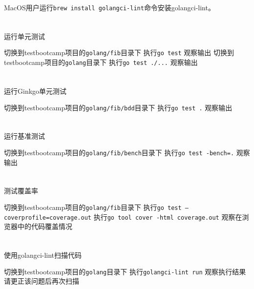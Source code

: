 \documentclass[12pt,addpoints,fleqn]{exam}
\begin{document}
\begin{questions}
\begin{parts}
MacOS用户运行\verb=brew install golangci-lint=命令安装golangci-lint。

  \part{}运行单元测试
  \begin{subparts}
    \subpart{}切换到testbootcamp项目的\verb=golang/fib=目录下
    \subpart{}执行\verb=go test=
    \subpart{}观察输出
    \subpart{}切换到testbootcamp项目的\verb=golang=目录下
    \subpart{}执行\verb=go test ./...=
    \subpart{}观察输出 
  \end{subparts}

  \part{}运行Ginkgo单元测试
  \begin{subparts}
    \subpart{}切换到testbootcamp项目的\verb=golang/fib/bdd=目录下
    \subpart{}执行\verb=go test .=
    \subpart{}观察输出
  \end{subparts}
  \part{}运行基准测试
  \begin{subparts}
    \subpart{}切换到testbootcamp项目的\verb=golang/fib/bench=目录下
    \subpart{}执行\verb#go test -bench=.#
    \subpart{}观察输出
  \end{subparts}
  \part{}测试覆盖率
  \begin{subparts}
    \subpart{}切换到testbootcamp项目的\verb=golang/fib=目录下
    \subpart{}执行\verb#go test –coverprofile=coverage.out#
    \subpart{}执行\verb#go tool cover -html coverage.out#
    \subpart{}观察在浏览器中的代码覆盖情况
  \end{subparts}
  \part{}使用golangci-lint扫描代码
  \begin{subparts}
    \subpart{}切换到testbootcamp项目的\verb=golang=目录下
    \subpart{}执行\verb#golangci-lint run#
    \subpart{}观察执行结果 
    \subpart{}请更正该问题后再次扫描
  \end{subparts}
\end{parts}


\end{questions}
\end{document}
